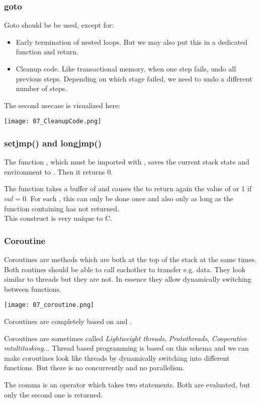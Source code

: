 \subsubsection{goto}
Goto should be be used, except for:
\begin{itemize}
    \item Early termination of nested loops. But we may also put this in a dedicated function and return.
    \item Cleanup code. Like transactional memory, when one step fails, undo all previous steps. Depending on which stage failed, we need to undo a different number of steps.
\end{itemize}

The second usecase is visualized here:

\texttt{[image: 07\_CleanupCode.png]}

\subsubsection{setjmp() and longjmp()}
The function , which must be imported with , saves the current stack state and environment to . Then it returns $0$.

The function  takes a buffer of  and causes the  to return again the value of  or $1$ if $val = 0$. For each , this can only be done once and also only as long as the function containing  has not returned.\\
This construct is very unique to C.

\subsubsection{Coroutine}
Coroutines are methods which are both at the top of the stack at the same times. Both routines should be able to call eachother to transfer e.g. data. They look similar to threads but they are not. In essence they allow dynamically switching between functions.

\texttt{[image: 07\_coroutine.png]}

Coroutines are completely based on  and .

Coroutines are sometimes called \textit{Lightweight threads}, \textit{Protothreads}, \textit{Cooperative mtultitasking}... Thread based programming is based on this schema and we can make coroutines look like threads by dynamically switching into different functions. But there is no concurrently and no parallelism.

The comma is an operator which takes two statements. Both are evaluated, but only the second one is returned.
